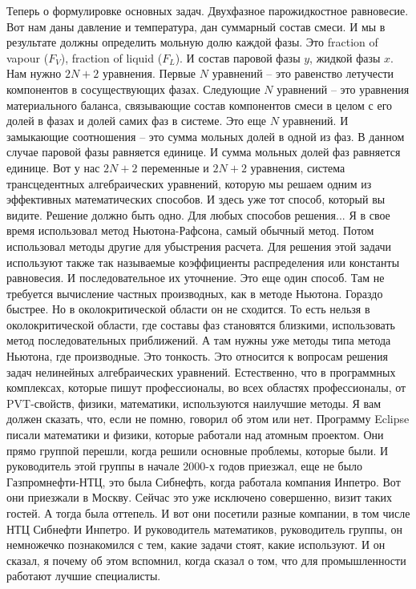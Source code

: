 \documentclass[main.tex]{subfiles}
\begin{document}
Теперь о формулировке основных задач.
Двухфазное парожидкостное равновесие.
Вот нам даны давление и температура, дан суммарный состав смеси.
И мы в результате должны определить мольную долю каждой фазы.
Это fraction of vapour ($F_V$), fraction of liquid ($F_L$).
И состав паровой фазы $y$, жидкой фазы $x$.
Нам нужно $2N+2$ уравнения.
Первые $N$ уравнений -- это равенство летучести компонентов в сосуществующих фазах.
Следующие $N$ уравнений -- это уравнения материального баланса, связывающие состав компонентов смеси в целом с его долей в фазах и долей самих фаз в системе.
Это еще $N$ уравнений.
И замыкающие соотношения -- это сумма мольных долей в одной из фаз.
В данном случае паровой фазы равняется единице.
И сумма мольных долей фаз равняется единице.
Вот у нас $2N+2$ переменные и $2N+2$ уравнения, система трансцедентных алгебраических уравнений, которую мы решаем одним из эффективных математических способов.
И здесь уже тот способ, который вы видите.
Решение должно быть одно.
Для любых способов решения...
Я в свое время использовал метод Ньютона-Рафсона, самый обычный метод.
Потом использовал методы другие для убыстрения расчета.
Для решения этой задачи используют также так называемые коэффициенты распределения или константы равновесия.
И последовательное их уточнение.
Это еще один способ.
Там не требуется вычисление частных производных, как в методе Ньютона.
Гораздо быстрее.
Но в околокритической области он не сходится.
То есть нельзя в околокритической области, где составы фаз становятся близкими, использовать метод последовательных приближений.
А там нужны уже методы типа метода Ньютона, где производные.
Это тонкость.
Это относится к вопросам решения задач нелинейных алгебраических уравнений.
Естественно, что в программных комплексах, которые пишут профессионалы, во всех областях профессионалы, от PVT-свойств, физики, математики, используются наилучшие методы.
Я вам должен сказать, что, если не помню, говорил об этом или нет.
Программу Eclipse писали математики и физики, которые работали над атомным проектом.
Они прямо группой перешли, когда решили основные проблемы, которые были.
И руководитель этой группы в начале 2000-х годов приезжал, еще не было Газпромнефти-НТЦ, это была Сибнефть, когда работала компания Инпетро.
Вот они приезжали в Москву.
Сейчас это уже исключено совершенно, визит таких гостей.
А тогда была оттепель.
И вот они посетили разные компании, в том числе НТЦ Сибнефти Инпетро.
И руководитель математиков, руководитель группы, он немножечко познакомился с тем, какие задачи стоят, какие используют.
И он сказал, я почему об этом вспомнил, когда сказал о том, что для промышленности работают лучшие специалисты.
\end{document}
